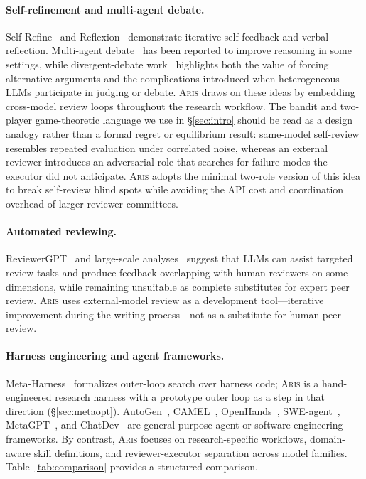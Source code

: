 \documentclass{article}
\newcommand{\aris}{\textsc{Aris}}
\theoremstyle{remark}
\begin{document}
\paragraph{Self-refinement and multi-agent debate.}
Self-Refine~\citep{madaan2023selfrefine} and Reflexion~\citep{shinn2023reflexion} demonstrate iterative self-feedback and verbal reflection. 
Multi-agent debate~\citep{du2024multiagentdebate} has been reported to improve reasoning in some settings, while divergent-debate work~\citep{liang2024divergent} highlights both the value of forcing alternative arguments and the complications introduced when heterogeneous LLMs participate in judging or debate.
\aris{} draws on these ideas by embedding cross-model review loops throughout the research workflow.
The bandit and two-player game-theoretic language we use in \S\ref{sec:intro} should be read as a design analogy rather than a formal regret or equilibrium result: same-model self-review resembles repeated evaluation under correlated noise, whereas an external reviewer introduces an adversarial role that searches for failure modes the executor did not anticipate.
\aris{} adopts the minimal two-role version of this idea to break self-review blind spots while avoiding the API cost and coordination overhead of larger reviewer committees.

\paragraph{Automated reviewing.}
ReviewerGPT~\citep{liu2023reviewergpt} and large-scale analyses~\citep{liang2024llmfeedback} suggest that LLMs can assist targeted review tasks and produce feedback overlapping with human reviewers on some dimensions, while remaining unsuitable as complete substitutes for expert peer review.
\aris{} uses external-model review as a development tool---iterative improvement during the writing process---not as a substitute for human peer review.

\paragraph{Harness engineering and agent frameworks.}
Meta-Harness~\citep{lee2026metaharness} formalizes outer-loop search over harness code; \aris{} is a hand-engineered research harness with a prototype outer loop as a step in that direction (\S\ref{sec:metaopt}).
AutoGen~\citep{wu2023autogen}, CAMEL~\citep{li2023camel}, OpenHands~\citep{wang2025openhands}, SWE-agent~\citep{yang2024sweagent}, MetaGPT~\citep{hong2024metagpt}, and ChatDev~\citep{qian2024chatdev} are general-purpose agent or software-engineering frameworks.
By contrast, \aris{} focuses on research-specific workflows, domain-aware skill definitions, and reviewer-executor separation across model families.
Table~\ref{tab:comparison} provides a structured comparison.
\end{document}
